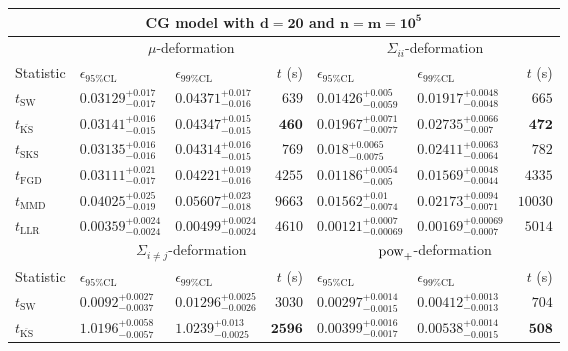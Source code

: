 \begin{tabular}{l|llr|llr}
	\toprule
	\multicolumn{7}{c}{{\bf CG model with $\mathbf{d=20}$ and $\mathbf{n=m=10^{5}}$}} \\
	\toprule
	\multicolumn{1}{c}{} & \multicolumn{3}{c}{$\mu$-deformation} & \multicolumn{3}{c}{$\Sigma_{ii}$-deformation} \\
	Statistic & $\epsilon_{95\%\mathrm{CL}}$ & $\epsilon_{99\%\mathrm{CL}}$ & $t$ (s) & $\epsilon_{95\%\mathrm{CL}}$ & $\epsilon_{99\%\mathrm{CL}}$ & $t$ (s) \\
	\midrule
	$t_{\mathrm{SW}}$ & $0.03129_{-0.017}^{+0.017}$ & $0.04371_{-0.016}^{+0.017}$ & $639$ & $0.01426_{-0.0059}^{+0.005}$ & $0.01917_{-0.0048}^{+0.0048}$ & $665$ \\
	$t_{\overline{\mathrm{KS}}}$ & $0.03141_{-0.015}^{+0.016}$ & $0.04347_{-0.015}^{+0.015}$ & ${\mathbf{460}}$ & $0.01967_{-0.0077}^{+0.0071}$ & $0.02735_{-0.007}^{+0.0066}$ & ${\mathbf{472}}$ \\
	$t_{\mathrm{SKS}}$ & $0.03135_{-0.016}^{+0.016}$ & $0.04314_{-0.015}^{+0.016}$ & $769$ & $0.018_{-0.0075}^{+0.0065}$ & $0.02411_{-0.0064}^{+0.0063}$ & $782$ \\
	$t_{\mathrm{FGD}}$ & ${\mathbf{0.03111_{-0.017}^{+0.021}}}$ & ${\mathbf{0.04221_{-0.016}^{+0.019}}}$ & $4255$ & ${\mathbf{0.01186_{-0.005}^{+0.0054}}}$ & ${\mathbf{0.01569_{-0.0044}^{+0.0048}}}$ & $4335$ \\
	$t_{\mathrm{MMD}}$ & $0.04025_{-0.019}^{+0.025}$ & $0.05607_{-0.018}^{+0.023}$ & $9663$ & $0.01562_{-0.0074}^{+0.01}$ & $0.02173_{-0.0071}^{+0.0094}$ & $10030$ \\
	$t_{\mathrm{LLR}}$ & $0.00359_{-0.0024}^{+0.0024}$ & $0.00499_{-0.0024}^{+0.0024}$ & $4610$ & $0.00121_{-0.00069}^{+0.0007}$ & $0.00169_{-0.0007}^{+0.00069}$ & $5014$ \\
	\toprule
	\multicolumn{1}{c}{} & \multicolumn{3}{c}{$\Sigma_{i\neq j}$-deformation} & \multicolumn{3}{c}{$\rm{pow}_{+}$-deformation} \\
	Statistic & $\epsilon_{95\%\mathrm{CL}}$ & $\epsilon_{99\%\mathrm{CL}}$ & $t$ (s) & $\epsilon_{95\%\mathrm{CL}}$ & $\epsilon_{99\%\mathrm{CL}}$ & $t$ (s) \\
	\midrule
	$t_{\mathrm{SW}}$ & $0.0092_{-0.0037}^{+0.0027}$ & $0.01296_{-0.0026}^{+0.0025}$ & $3030$ & $0.00297_{-0.0015}^{+0.0014}$ & $0.00412_{-0.0013}^{+0.0013}$ & $704$ \\
	$t_{\overline{\mathrm{KS}}}$ & $1.0196_{-0.0057}^{+0.0058}$ & $1.0239_{-0.0025}^{+0.013}$ & ${\mathbf{2596}}$ & $0.00399_{-0.0017}^{+0.0016}$ & $0.00538_{-0.0015}^{+0.0014}$ & ${\mathbf{508}}$ \\

\end{tabular}
